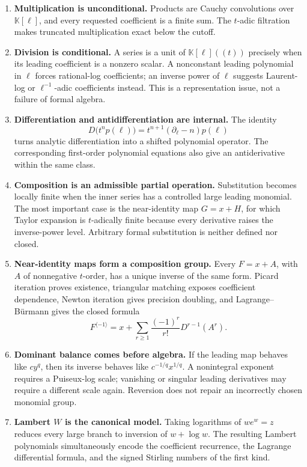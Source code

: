 \documentclass[11pt,oneside]{article}
\numberwithin{equation}{section}
\theoremstyle{definition}
\newcommand{\K}{\mathbb K}
\newcommand{\rev}{\langle -1\rangle}
\begin{document}
\begin{enumerate}
\item \textbf{Multiplication is unconditional.}
  Products are Cauchy convolutions over \(\K[\ell]\), and every requested
  coefficient is a finite sum.  The \(t\)-adic filtration makes truncated
  multiplication exact below the cutoff.

\item \textbf{Division is conditional.}
  A series is a unit of \(\K[\ell]((t))\) precisely when its leading
  coefficient is a nonzero scalar.  A nonconstant leading polynomial in
  \(\ell\) forces rational-log coefficients; an inverse power of \(\ell\)
  suggests Laurent-log or \(\ell^{-1}\)-adic coefficients instead.  This is a
  representation issue, not a failure of formal algebra.

\item \textbf{Differentiation and antidifferentiation are internal.}
  The identity
  \[
    D\bigl(t^n p(\ell)\bigr)
       =t^{n+1}(\partial_\ell-n)p(\ell)
  \]
  turns analytic differentiation into a shifted polynomial operator.  The
  corresponding first-order polynomial equations also give an antiderivative
  within the same class.

\item \textbf{Composition is an admissible partial operation.}
  Substitution becomes locally finite when the inner series has a controlled
  large leading monomial.  The most important case is the near-identity map
  \(G=x+H\), for which Taylor expansion is \(t\)-adically finite because every
  derivative raises the inverse-power level.  Arbitrary formal substitution is
  neither defined nor closed.

\item \textbf{Near-identity maps form a composition group.}
  Every \(F=x+A\), with \(A\) of nonnegative \(t\)-order, has a unique inverse
  of the same form.  Picard iteration proves existence, triangular matching
  exposes coefficient dependence, Newton iteration gives precision doubling,
  and Lagrange--B\"urmann gives the closed formula
  \[
    F^{\rev}=x+\sum_{r\ge1}\frac{(-1)^r}{r!}D^{r-1}(A^r).
  \]

\item \textbf{Dominant balance comes before algebra.}
  If the leading map behaves like \(cy^q\), then its inverse behaves like
  \(c^{-1/q}x^{1/q}\).  A nonintegral exponent requires a Puiseux-log scale;
  vanishing or singular leading derivatives may require a different scale
  again.  Reversion does not repair an incorrectly chosen monomial group.

\item \textbf{Lambert \(W\) is the canonical model.}
  Taking logarithms of \(we^w=z\) reduces every large branch to inversion of
  \(w+\log w\).  The resulting Lambert polynomials simultaneously encode the
  coefficient recurrence, the Lagrange differential formula, and the signed
  Stirling numbers of the first kind.
\end{enumerate}
\end{document}
